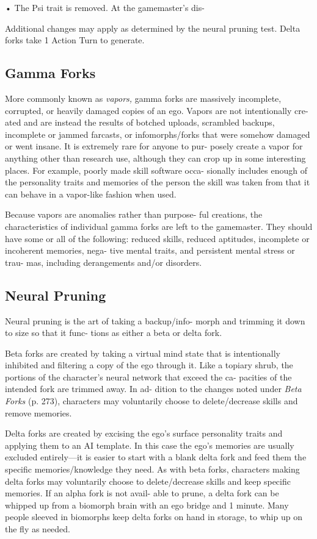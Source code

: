 •  The Psi trait is removed. At the gamemaster's dis-

Additional changes may apply as determined by the 
neural pruning test. Delta forks take 1 Action Turn 
to generate.

\subsection{Gamma Forks}

More commonly known as \textit{vapors,} gamma forks are 
massively incomplete, corrupted, or heavily damaged 
copies of an ego. Vapors are not intentionally cre-
ated and are instead the results of botched uploads, 
scrambled backups, incomplete or jammed farcasts, 
or infomorphs/forks that were somehow damaged or 
went insane. It is extremely rare for anyone to pur-
posely create a vapor for anything other than research 
use, although they can crop up in some interesting 
places. For example, poorly made skill software occa-
sionally includes enough of the personality traits and 
memories of the person the skill was taken from that 
it can behave in a vapor-like fashion when used.

Because vapors are anomalies rather than purpose-
ful creations, the characteristics of individual gamma 
forks are left to the gamemaster. They should have 
some or all of the following: reduced skills, reduced 
aptitudes, incomplete or incoherent memories, nega-
tive mental traits, and persistent mental stress or trau-
mas, including derangements and/or disorders.

\subsection{Neural Pruning}

Neural pruning is the art of taking a backup/info-
morph and trimming it down to size so that it func-
tions as either a beta or delta fork.

Beta forks are created by taking a virtual mind state 
that is intentionally inhibited and filtering a copy of 
the ego through it. Like a topiary shrub, the portions 
of the character's neural network that exceed the ca-
pacities of the intended fork are trimmed away. In ad-
dition to the changes noted under \textit{Beta Forks} (p. 273), 
characters may voluntarily choose to delete/decrease 
skills and remove memories.

Delta forks are created by excising the ego's surface 
personality traits and applying them to an AI template. 
In this case the ego's memories are usually excluded 
entirely—it is easier to start with a blank delta fork 
and feed them the specific memories/knowledge they 
need. As with beta forks, characters making delta forks 
may voluntarily choose to delete/decrease skills and 
keep specific memories. If an alpha fork is not avail-
able to prune, a delta fork can be whipped up from 
a biomorph brain with an ego bridge and 1 minute. 
Many people sleeved in biomorphs keep delta forks on 
hand in storage, to whip up on the fly as needed.

